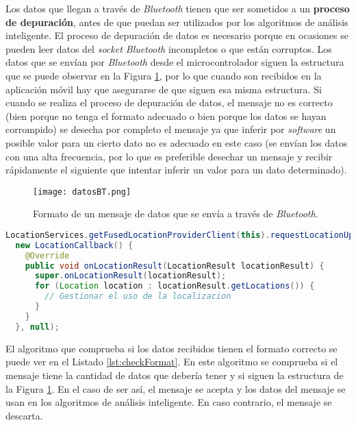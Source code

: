 Los datos que llegan a través de \textit{Bluetooth} tienen que ser sometidos a un \textbf{proceso de depuración}, antes de que puedan ser utilizados por los algoritmos de análisis inteligente. El proceso de depuración de datos es necesario porque en ocasiones se pueden leer datos del \textit{socket Bluetooth} incompletos o que están corruptos. Los datos que se envían por \textit{Bluetooth} desde el microcontrolador siguen la estructura que se puede observar en la Figura \ref{fig:datosBT}, por lo que cuando son recibidos en la aplicación móvil hay que asegurarse de que siguen esa misma estructura. Si cuando se realiza el proceso de depuración de datos, el mensaje no es correcto (bien porque no tenga el formato adecuado o bien porque los datos se hayan corrompido) se desecha por completo el mensaje ya que inferir por \textit{software} un posible valor para un cierto dato no es adecuado en este caso (se envían los datos con una alta frecuencia, por lo que es preferible desechar un mensaje y recibir rápidamente el siguiente que intentar inferir un valor para un dato determinado).

\begin{figure}[!h]
\begin{center}
\texttt{[image: datosBT.png]}
\caption{Formato de un mensaje de datos que se envía a través de \textit{Bluetooth}.}
\label{fig:datosBT}
\end{center}
\end{figure}

\begin{lstlisting}[language=java,captionpos=t,caption={\textbf{Obtener datos de localización usando el dispositivo móvil.}},label={lst:location}]
LocationServices.getFusedLocationProviderClient(this).requestLocationUpdates(mLocationRequest,
  new LocationCallback() {
    @Override
    public void onLocationResult(LocationResult locationResult) {
      super.onLocationResult(locationResult);
      for (Location location : locationResult.getLocations()) {
        // Gestionar el uso de la localizacion
      }
    }
  }, null);
\end{lstlisting}

El algoritmo que comprueba si los datos recibidos tienen el formato correcto se puede ver en el Listado \ref{lst:checkFormat}. En este algoritmo se comprueba si el mensaje tiene la cantidad de datos que debería tener y si siguen la estructura de la Figura \ref{fig:datosBT}. En el caso de ser así, el mensaje se acepta y los datos del mensaje se usan en los algoritmos de análisis inteligente. En caso contrario, el mensaje se descarta.

